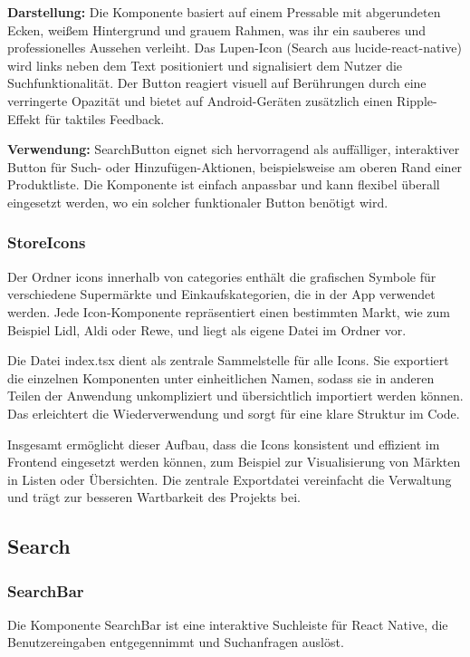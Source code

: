\textbf{Darstellung:}
Die Komponente basiert auf einem Pressable mit abgerundeten Ecken, weißem Hintergrund und grauem Rahmen, was ihr ein sauberes und professionelles Aussehen verleiht. Das Lupen-Icon (Search aus lucide-react-native) wird links neben dem Text positioniert und signalisiert dem Nutzer die Suchfunktionalität. Der Button reagiert visuell auf Berührungen durch eine verringerte Opazität und bietet auf Android-Geräten zusätzlich einen Ripple-Effekt für taktiles Feedback.

\noindent\textbf{Verwendung:} SearchButton eignet sich hervorragend als auffälliger, interaktiver Button für Such- oder Hinzufügen-Aktionen, beispielsweise am oberen Rand einer Produktliste. Die Komponente ist einfach anpassbar und kann flexibel überall eingesetzt werden, wo ein solcher funktionaler Button benötigt wird.

\subsubsection{StoreIcons}
Der Ordner icons innerhalb von categories enthält die grafischen Symbole für verschiedene Supermärkte und Einkaufskategorien, die in der App verwendet werden. Jede Icon-Komponente repräsentiert einen bestimmten Markt, wie zum Beispiel Lidl, Aldi oder Rewe, und liegt als eigene Datei im Ordner vor.

Die Datei index.tsx dient als zentrale Sammelstelle für alle Icons. Sie exportiert die einzelnen Komponenten unter einheitlichen Namen, sodass sie in anderen Teilen der Anwendung unkompliziert und übersichtlich importiert werden können. Das erleichtert die Wiederverwendung und sorgt für eine klare Struktur im Code.

Insgesamt ermöglicht dieser Aufbau, dass die Icons konsistent und effizient im Frontend eingesetzt werden können, zum Beispiel zur Visualisierung von Märkten in Listen oder Übersichten. Die zentrale Exportdatei vereinfacht die Verwaltung und trägt zur besseren Wartbarkeit des Projekts bei.

\subsection{Search}

\subsubsection{SearchBar}
Die Komponente SearchBar ist eine interaktive Suchleiste für React Native, die Benutzereingaben entgegennimmt und Suchanfragen auslöst.


